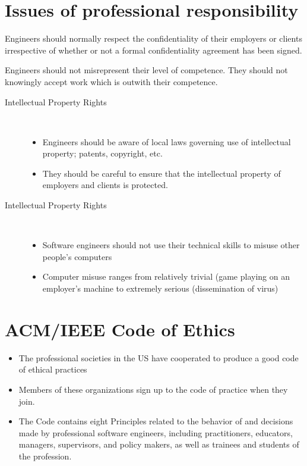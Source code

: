 \documentclass{report}
\begin{document}
\section{Issues of professional responsibility}
\begin{description}[style=multiline,leftmargin=8em]
  \item [Confidentiality] Engineers should normally respect the confidentiality of their employers or clients irrespective of whether or not a formal confidentiality agreement has been signed.
  \item [Competence] Engineers should not misrepresent their level of competence. They should not knowingly accept work which is outwith their competence.
\end{description}
\begin{description}
  \item [Intellectual Property Rights] \
  \begin{itemize}
    \item Engineers should be aware of local laws governing use of intellectual property; patents, copyright, etc.
    \item They should be careful to ensure that the intellectual property of employers and clients is protected.
  \end{itemize}
  \item [Intellectual Property Rights] \
  \begin{itemize}
    \item Software engineers should not use their technical skills to misuse other people's computers
    \item Computer misuse ranges from relatively trivial (game playing on an employer's machine to extremely serious (dissemination of virus)
  \end{itemize}
\end{description}

\section{ACM/IEEE Code of Ethics}
\begin{itemize}
  \item The professional societies in the US have cooperated to produce a good code of ethical practices
  \item Members of these organizations sign up to the code of practice when they join.
  \item The Code contains eight Principles related to the behavior of and decisions made by professional software engineers, including practitioners, educators, managers, supervisors, and policy makers, as well as trainees and students of the profession.
\end{itemize}
\end{document}
